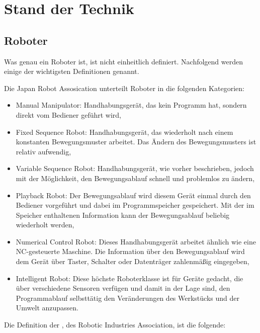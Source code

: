 \chapter{Stand der Technik}
\label{chap:Technik}

\section{Roboter}

Was genau ein Roboter ist, ist nicht einheitlich definiert. Nachfolgend werden einige der wichtigsten Definitionen genannt.

Die Japan Robot Assosication  unterteilt Roboter in die folgenden Kategorien\footnotemark[3] :


\begin{itemize}
\item Manual Manipulator: Handhabungsgerät, das kein Programm hat, sondern direkt vom Bediener geführt wird,
\item Fixed Sequence Robot: Handhabungsgerät, das wiederholt nach einem konstanten Bewegungsmuster arbeitet. Das Ändern des Bewegungsmusters ist relativ aufwendig,
\item Variable Sequence Robot: Handhabungsgerät, wie vorher beschrieben, jedoch mit der Möglichkeit, den Bewegungsablauf schnell und problemlos zu ändern,
\item Playback Robot: Der Bewegungsablauf wird diesem Gerät einmal durch den Bediener vorgeführt und dabei im Programmspeicher gespeichert. Mit der im Speicher enthaltenen Information kann der Bewegungsablauf beliebig wiederholt werden,
\item Numerical Control Robot: Dieses Handhabungsgerät arbeitet ähnlich wie eine NC-gesteuerte Maschine. Die Information über den Bewegungsablauf wird dem Gerät über Taster, Schalter oder Datenträger zahlenmäßig eingegeben,
\item Intelligent Robot: Diese höchste Roboterklasse ist für Geräte gedacht, die über verschiedene Sensoren verfügen und damit in der Lage sind, den Programmablauf selbsttätig den Veränderungen des Werkstücks und der Umwelt anzupassen.
\end{itemize}

Die Definition der \footnotemark[4], des Robotic Industries Association, ist die folgende:

